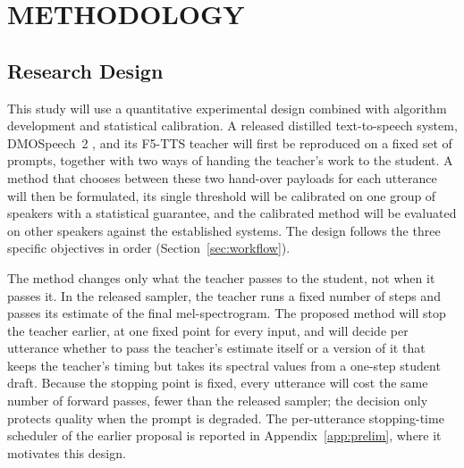 
\section{METHODOLOGY}
\label{sec:method}


\subsection{Research Design}
\label{sec:design}

This study will use a quantitative experimental design combined with algorithm development and statistical calibration. A released distilled text-to-speech system, DMOSpeech~2 \parencite{li2025dmospeech2}, and its F5-TTS teacher \parencite{chen2024f5} will first be reproduced on a fixed set of prompts, together with two ways of handing the teacher's work to the student. A method that chooses between these two hand-over payloads for each utterance will then be formulated, its single threshold will be calibrated on one group of speakers with a statistical guarantee, and the calibrated method will be evaluated on other speakers against the established systems. The design follows the three specific objectives in order (Section~\ref{sec:workflow}).

The method changes only what the teacher passes to the student, not when it passes it. In the released sampler, the teacher runs a fixed number of steps and passes its estimate of the final mel-spectrogram. The proposed method will stop the teacher earlier, at one fixed point for every input, and will decide per utterance whether to pass the teacher's estimate itself or a version of it that keeps the teacher's timing but takes its spectral values from a one-step student draft. Because the stopping point is fixed, every utterance will cost the same number of forward passes, fewer than the released sampler; the decision only protects quality when the prompt is degraded. The per-utterance stopping-time scheduler of the earlier proposal is reported in Appendix~\ref{app:prelim}, where it motivates this design.

